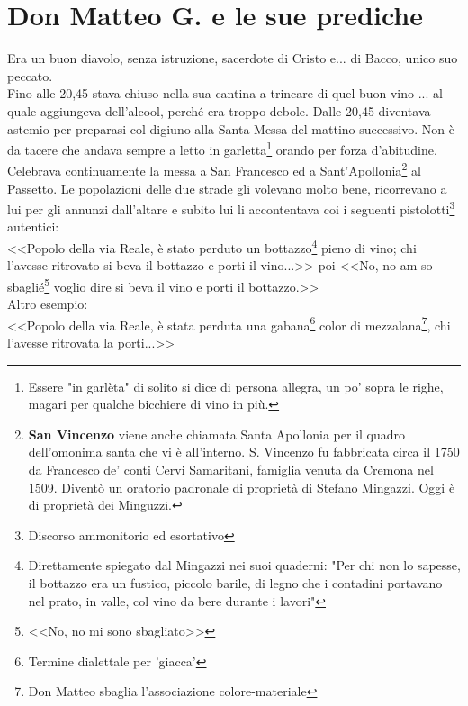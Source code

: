 
\chapter{Don Matteo G. e le sue prediche}
Era un buon diavolo, senza istruzione, sacerdote di Cristo e... di Bacco, unico suo peccato.\\
\indent Fino alle 20,45 stava chiuso nella sua cantina a trincare di quel buon vino ... al quale aggiungeva dell'alcool, perché era troppo debole. Dalle 20,45 diventava astemio per preparasi col digiuno alla Santa Messa del mattino successivo. Non è da tacere che andava sempre a letto in garletta\footnote{Essere "in garlèta" di solito si dice di persona allegra, un po' sopra le righe, magari per qualche bicchiere di vino in più.} orando per forza d'abitudine. Celebrava continuamente la messa a San Francesco ed a Sant'Apollonia\footnote{\textbf{San Vincenzo} viene anche chiamata Santa Apollonia per il quadro dell'omonima santa che vi è all'interno. S. Vincenzo fu fabbricata circa il 1750 da Francesco de' conti Cervi Samaritani, famiglia venuta da Cremona nel 1509. Diventò un oratorio padronale di proprietà di Stefano Mingazzi. Oggi è di proprietà dei Minguzzi.} al Passetto. Le popolazioni delle due strade gli volevano molto bene, ricorrevano a lui per gli annunzi dall'altare e subito lui li accontentava coi i seguenti pistolotti\footnote{Discorso ammonitorio ed esortativo} autentici:\\
\indent <<Popolo della via Reale, è stato perduto un bottazzo\footnote{Direttamente spiegato dal Mingazzi nei suoi quaderni: "Per chi non lo sapesse, il bottazzo era un fustico, piccolo barile, di legno che i contadini portavano nel prato, in valle, col vino da bere durante i lavori"} pieno di vino; chi l'avesse ritrovato si beva il bottazzo e porti il vino...>> poi <<No, no am so sbaglié\footnote{<<No, no mi sono sbagliato>>} voglio dire si beva il vino e porti il bottazzo.>>\\
\indent Altro esempio:\\
\indent<<Popolo della via Reale, è stata perduta una gabana\footnote{Termine dialettale per 'giacca'} color di mezzalana\footnote{Don Matteo sbaglia l'associazione colore-materiale}, chi l'avesse ritrovata la porti...>>

